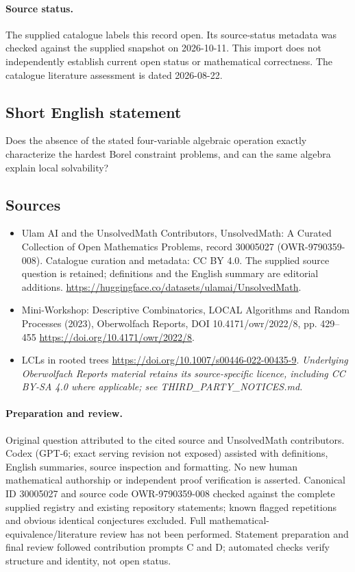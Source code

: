 \documentclass[11pt]{article}
\begin{document}
\paragraph{Source status.}
The supplied catalogue labels this record open. Its source-status metadata was checked against the supplied snapshot on 2026-10-11. This import does not independently establish current open status or mathematical correctness. The catalogue literature assessment is dated 2026-08-22.
\subsection{Short English statement}
Does the absence of the stated four-variable algebraic operation exactly characterize the hardest Borel constraint problems, and can the same algebra explain local solvability?
\subsection{Sources}
\begin{itemize}
\item[\hypertarget{source:30005027:1}{S1}] Ulam AI and the UnsolvedMath Contributors, UnsolvedMath: A Curated Collection of Open Mathematics Problems, record 30005027 (OWR-9790359-008). Catalogue curation and metadata: CC BY 4.0. The supplied source question is retained; definitions and the English summary are editorial additions.
\url{https://huggingface.co/datasets/ulamai/UnsolvedMath}.
\item[\hypertarget{source:30005027:2}{S2}] Mini-Workshop: Descriptive Combinatorics, LOCAL Algorithms and Random Processes (2023), Oberwolfach Reports, DOI 10.4171/owr/2022/8, pp. 429--455
\url{https://doi.org/10.4171/owr/2022/8}.
\item[\hypertarget{source:30005027:3}{S3}] LCLs in rooted trees
\url{https://doi.org/10.1007/s00446-022-00435-9}.
\textit{Underlying Oberwolfach Reports material retains its source-specific licence, including CC BY-SA 4.0 where applicable; see THIRD\_PARTY\_NOTICES.md.}
\end{itemize}
\paragraph{Preparation and review.}
Original question attributed to the cited source and UnsolvedMath contributors. Codex (GPT-6; exact serving revision not exposed) assisted with definitions, English summaries, source inspection and formatting. No new human mathematical authorship or independent proof verification is asserted. Canonical ID 30005027 and source code OWR-9790359-008 checked against the complete supplied registry and existing repository statements; known flagged repetitions and obvious identical conjectures excluded. Full mathematical-equivalence/literature review has not been performed. Statement preparation and final review followed contribution prompts C and D; automated checks verify structure and identity, not open status.
\label{end:30005027}
\end{document}
